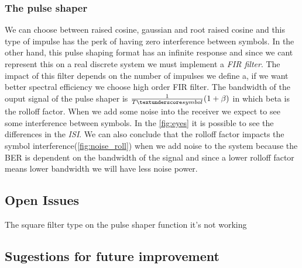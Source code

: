 \begin{text}
\subsubsection{The pulse shaper}
We can choose between raised cosine, gaussian and root raised cosine and this type of impulse has the perk of having zero interference between symbols. In the other hand, this pulse shaping format has an infinite response and since we cant represent this on a real discrete system we must implement a \textit{FIR filter}.\newline
The impact of this filter depends on the number of impulses we define a, if we want better spectral efficiency we choose high order FIR filter.\newline
The bandwidth of the ouput signal of the pulse shaper is $ \frac{1}{T\textunderscore symbol}(1 + \beta) $ in which beta is the rolloff factor.\newline
When we add some noise into the receiver we expect to see some interference between symbols. In the \ref{fig:eyes} it is possible to see the differences in the \textit{ISI}. We can also conclude that the rolloff factor impacts the symbol interference(\ref{fig:noise_roll}) when we add noise to the system because the BER is dependent on the bandwidth of the signal and since a lower rolloff factor means lower bandwidth we will have less noise power.
\end{text}
\subsection{Open Issues}
\begin{text}
	The square filter type on the pulse shaper function it's not working
\end{text}
\subsection*{Sugestions for future improvement}
